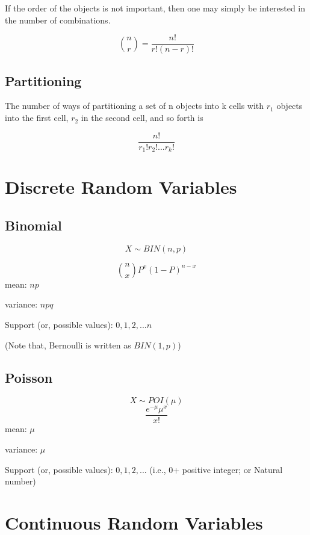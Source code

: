 \documentclass[]{book}
\begin{document}
If the order of the objects is not important, then one may simply be interested in the number of combinations.

\[\binom{n}{r}=\frac{n!}{r!(n-r)!}\]

\hypertarget{partitioning}{%
\subsection{Partitioning}\label{partitioning}}

The number of ways of partitioning a set of n objects into k cells with \(r_1\) objects into the first cell, \(r_2\) in the second cell, and so forth is

\[\frac{n!}{r_1! r_2! ...r_k!}\]

\hypertarget{discrete-random-variables}{%
\section{Discrete Random Variables}\label{discrete-random-variables}}

\hypertarget{binomial}{%
\subsection{Binomial}\label{binomial}}

\[X\sim BIN(n,p)\]

\[\binom{n}{x}P^x(1-P)^{n-x}\]
mean: \(np\)

variance: \(npq\)

Support (or, possible values): \(0, 1, 2,...n\)

(Note that, Bernoulli is written as \(BIN(1, p)\))

\hypertarget{poisson}{%
\subsection{Poisson}\label{poisson}}

\[X \sim POI(\mu)\]
\[\frac{e^{-\mu}\mu^x}{x!}\]
mean: \(\mu\)

variance: \(\mu\)

Support (or, possible values): \(0, 1, 2,...\) (i.e., 0+ positive integer; or Natural number)

\hypertarget{continuous-random-variables}{%
\section{Continuous Random Variables}\label{continuous-random-variables}}
\end{document}
